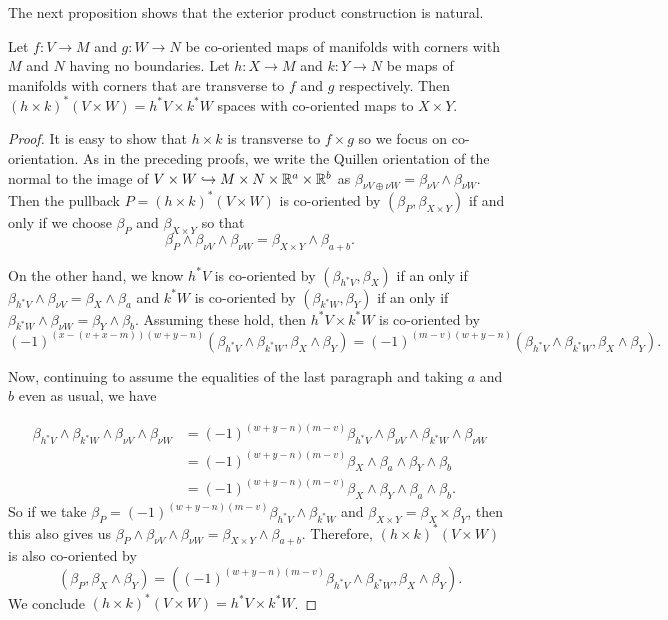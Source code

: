 The next proposition shows that the exterior product construction is natural.

\begin{proposition}\label{P: natural exterior}
	Let $f \colon V \to M$ and $g \colon W \to N$ be co-oriented maps of manifolds with corners with $M$ and $N$ having no boundaries.
	Let $h \colon X \to M$ and $k \colon Y \to N$ be maps of manifolds with corners that are transverse to $f$ and $g$ respectively.
	Then $(h \times k)^*(V \times W) = h^*V \times k^*W$ spaces with co-oriented maps to $X \times Y$.
\end{proposition}
\begin{proof}
	It is easy to show that $h \times k$ is transverse to $f \times g$ so we focus on co-orientation.
	As in the preceding proofs, we write the Quillen orientation of the normal to the image of $V \times W \hookrightarrow M \times N \times \mathbb{R}^a \times \mathbb{R}^b$ as $\beta_{\nu V \oplus \nu W} = \beta_{\nu V} \wedge \beta_{\nu W}$.
	Then the pullback $P = (h \times k)^*(V \times W)$ is co-oriented by $(\beta_P,\beta_{X \times Y})$ if and only if we choose $\beta_P$ and $\beta_{X \times Y}$ so that
	$$\beta_{P} \wedge \beta_{\nu V} \wedge \beta_{\nu W} = \beta_{X \times Y} \wedge \beta_{a+b}.$$

	On the other hand, we know $h^*V$ is co-oriented by $(\beta_{h^*V},\beta_X)$ if an only if $\beta_{h^*V} \wedge \beta_{\nu V} = \beta_X \wedge \beta_a$ and $k^*W$ is co-oriented by $(\beta_{k^*W},\beta_Y)$ if an only if $\beta_{k^*W} \wedge \beta_{\nu W} = \beta_Y \wedge \beta_b$.
	Assuming these hold, then $h^*V \times k^*W$ is co-oriented by $$(-1)^{(x-(v+x-m))(w+y-n)}(\beta_{h^*V} \wedge \beta_{k^*W},\beta_X \wedge \beta_Y) = (-1)^{(m-v)(w+y-n)}(\beta_{h^*V} \wedge \beta_{k^*W},\beta_X \wedge \beta_Y).$$

	Now, continuing to assume the equalities of the last paragraph and taking $a$ and $b$ even as usual, we have

	\begin{align*}
		\beta_{h^*V} \wedge \beta_{k^*W} \wedge \beta_{\nu V} \wedge \beta_{\nu W}
		& = (-1)^{(w+y-n)(m-v)}\beta_{h^*V} \wedge \beta_{\nu V} \wedge \beta_{k^*W} \wedge \beta_{\nu W}\\
		& = (-1)^{(w+y-n)(m-v)}\beta_X \wedge \beta_a \wedge \beta_Y \wedge \beta_b \\
		& = (-1)^{(w+y-n)(m-v)}\beta_X \wedge \beta_Y \wedge \beta_a \wedge \beta_b.
	\end{align*}
	So if we take $\beta_P = (-1)^{(w+y-n)(m-v)}\beta_{h^*V} \wedge \beta_{k^*W}$ and $\beta_{X \times Y} = \beta_X \times \beta_Y$, then this also gives us $\beta_{P} \wedge \beta_{\nu V} \wedge \beta_{\nu W} = \beta_{X \times Y} \wedge \beta_{a+b}$.
	Therefore,
	$(h \times k)^*(V \times W)$ is also co-oriented by
	$$(\beta_P,\beta_X \wedge \beta_Y) = ((-1)^{(w+y-n)(m-v)}\beta_{h^*V} \wedge \beta_{k^*W},\beta_X \wedge \beta_Y).$$ We conclude $(h \times k)^*(V \times W) = h^*V \times k^*W$.
\end{proof}

